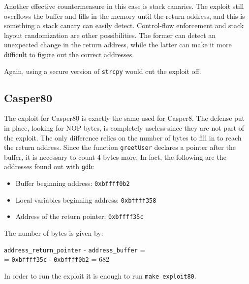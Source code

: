 Another effective countermeasure in this case is stack canaries. The exploit still overflows the buffer and fills in the memory until the return address, and this is something a stack canary can easily detect. Control-flow enforcement and stack layout randomization are other possibilities. The former can detect an unexpected change in the return address, while the latter can make it more difficult to figure out the correct addresses.

Again, using a secure version of \texttt{strcpy} would cut the exploit off.

\subsection{Casper80}
The exploit for Casper80 is exactly the same used for Casper8. The defense put in place, looking for NOP bytes, is completely useless since they are not part of the exploit. The only difference relies on the number of bytes to fill in to reach the return address. Since the function \texttt{greetUser} declares a pointer after the buffer, it is necessary to count 4 bytes more. In fact, the following are the addresses found out with \texttt{gdb}:
\begin{itemize}
	\item Buffer beginning address: \texttt{0xbffff0b2}
	\item Local variables beginning address: \texttt{0xbffff358}
	\item Address of the return pointer: \texttt{0xbffff35c}
\end{itemize}
The number of bytes is given by:
\begin{center}
	\texttt{address\_return\_pointer} - \texttt{address\_buffer} =\\
	= \texttt{0xbffff35c} - \texttt{0xbffff0b2} = 682
\end{center}


In order to run the exploit it is enough to run \texttt{make exploit80}.
